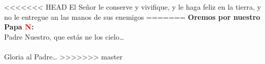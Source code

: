 <<<<<<< HEAD
    {El Señor le conserve y vivifique, y le haga feliz en la tierra, y no le entregue an las manos de sus enemigos}
=======
\textbf{Oremos por nuestro Papa \textcolor{red}{N}:}\\
Padre Nuestro, que estás ne los cielo\ldots\\
\\
Gloria al Padre\ldots
>>>>>>> master
